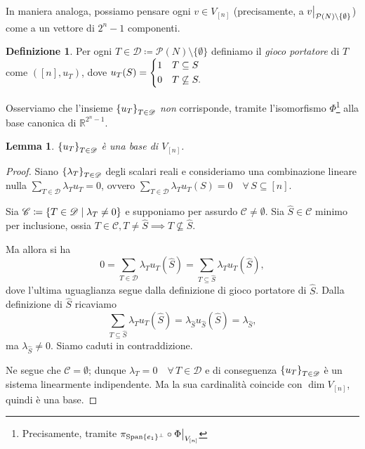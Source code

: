 \documentclass[a4paper,11pt]{article}
\theoremstyle{definition}				%
\newtheorem{definizione}{Definizione}%
\theoremstyle{remark}
\theoremstyle{plain}
\newtheorem{lemma}{Lemma}%
\newcommand\restr[2]{{											%
		\left.\kern-\nulldelimiterspace %
		#1 %
		\vphantom{\big|} %
		\right|_{#2} %
}}
\newcommand{\R}{\mathbb{R}}										%
\begin{document}
	In maniera analoga, possiamo pensare ogni $v\in V_{[n]}$ (precisamente, a $\restr{v}{\mathcal{P}(N)\setminus\qty{\emptyset}}$) come a un vettore di $2^n-1$ componenti.
    \begin{definizione}\label{def:carrier_game}
        Per ogni $T\in\mathscr{D}\coloneqq\mathcal{P}(N)\setminus\{\emptyset\}$ definiamo il \emph{gioco portatore} di $T$ come $\left([n],u_T\right)$, dove $u_T(S)=\begin{dcases}1 & T\subseteq S\\ 0 & T\not\subseteq S.\end{dcases}$
    \end{definizione}
    Osserviamo che l'insieme $\qty{u_T}_{T\in\mathscr{D}}$ \emph{non} corrisponde, tramite l'isomorfismo $\Phi$\footnote{Precisamente, tramite $\pi_{\mathrm{Span}\{e_1\}^{\perp}}\circ\restr{\Phi}{V_{[n]}}$} alla base canonica di $\R^{2^n-1}$.
    \begin{lemma}\label{lemma:basis}
        $\qty{u_T}_{T\in\mathscr{D}}$ è una base di $V_{[n]}$.
    \end{lemma}
    \begin{proof}
        Siano $\qty{\lambda_{T}}_{T\in\mathscr{D}}$ degli scalari reali e consideriamo una combinazione lineare nulla $\sum_{T\in\mathscr{D}}\lambda_Tu_T=0$, ovvero $\sum_{T\in\mathscr{D}}\lambda_Tu_T(S)=0\quad\forall\,S\subseteq[n]$.

        Sia $\mathscr{C}\coloneqq\qty{T\in\mathscr{D}\mid\lambda_T\neq 0}$ e supponiamo per assurdo $\mathscr{C}\ne\emptyset$. Sia $\hat{S}\in\mathscr{C}$ minimo per inclusione, ossia $T\in\mathscr{C}, T\ne\hat{S}\implies T\not\subseteq\hat{S}$.

        Ma allora si ha
        \[
            0=\sum_{T\in\mathscr{D}}\lambda_Tu_T(\hat{S})=\sum_{T\subseteq\hat{S}}\lambda_Tu_T(\hat{S}),
        \]
        dove l'ultima uguaglianza segue dalla definizione di gioco portatore di $\hat{S}$. Dalla definizione di $\hat{S}$ ricaviamo 
        \[
            \sum_{T\subseteq\hat{S}}\lambda_Tu_T(\hat{S})=\lambda_{\hat{S}}u_{\hat{S}}(\hat{S})=\lambda_{\hat{S}},
        \]
        ma $\lambda_{\hat{S}}\ne 0$. Siamo caduti in contraddizione.

        Ne segue che $\mathscr{C}=\emptyset$; dunque $\lambda_T=0\quad\forall\,T\in\mathscr{D}$ e di conseguenza $\qty{u_T}_{T\in\mathscr{D}}$ è un sistema linearmente indipendente. Ma la sua cardinalità coincide con $\dim V_{[n]}$, quindi è una base.
    \end{proof}
	
\end{document}
